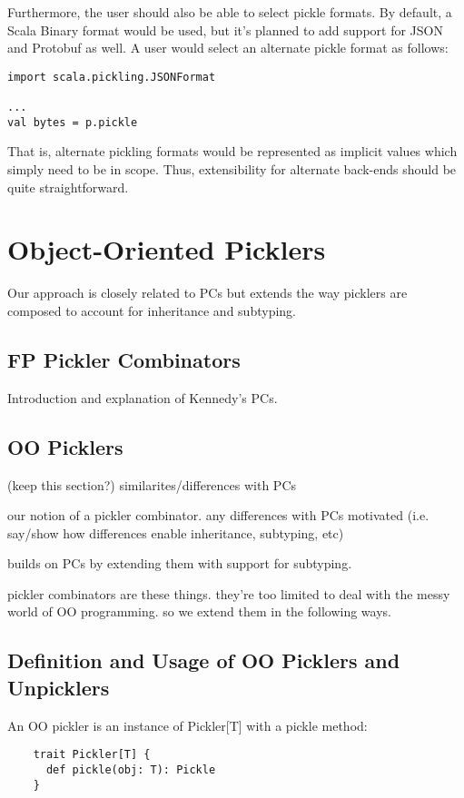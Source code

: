 \documentclass[preprint,10pt]{sigplanconf}
\theoremstyle{definition}
\begin{document}
Furthermore, the user should also be able to select pickle formats. By
default, a Scala Binary format would be used, but it's planned to add
support for JSON and Protobuf as well. A user would select an
alternate pickle format as follows:

\begin{verbatim}
import scala.pickling.JSONFormat

...
val bytes = p.pickle
\end{verbatim}\noindent

That is, alternate pickling formats would be represented as implicit
values which simply need to be in scope. Thus, extensibility for
alternate back-ends should be quite straightforward.

\section{Object-Oriented Picklers}
Our approach is closely related to PCs but extends the way picklers are composed to account for inheritance and subtyping.

\subsection{FP Pickler Combinators}
Introduction and explanation of Kennedy's PCs.

\subsection{OO Picklers}
(keep this section?) similarites/differences with PCs

our notion of a pickler combinator. any differences with PCs motivated (i.e. say/show how differences enable inheritance, subtyping, etc)

builds on PCs by extending them with support for subtyping.

pickler combinators are these things. they're too limited to deal with the messy world of OO programming. so we extend them in the following ways.

\subsection{Definition and Usage of OO Picklers and Unpicklers}

An OO pickler is an instance of Pickler[T] with a pickle method:

\begin{verbatim}
    trait Pickler[T] {
      def pickle(obj: T): Pickle
    }
\end{verbatim}
\end{document}
